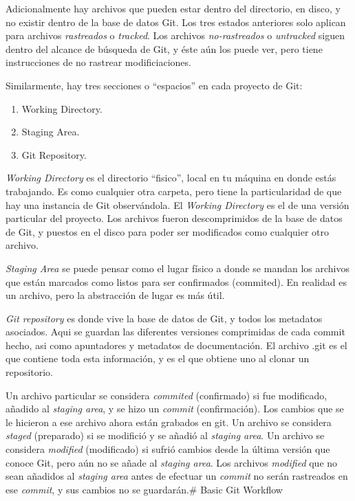 \documentclass[spanish, 12pt, a4paper]{article}
\begin{document}
Adicionalmente hay archivos que pueden estar dentro del directorio, en
disco, y no existir dentro de la base de datos Git. Los tres estados
anteriores solo aplican para archivos \emph{rastreados} o
\emph{tracked}. Los archivos \emph{no-rastreados} o \emph{untracked}
siguen dentro del alcance de búsqueda de Git, y éste aún los puede ver,
pero tiene instrucciones de no rastrear modificiaciones.

Similarmente, hay tres secciones o ``espacios'' en cada proyecto de Git:

\begin{enumerate}
\def\labelenumi{\arabic{enumi}.}
\item
  Working Directory.
\item
  Staging Area.
\item
  Git Repository.
\end{enumerate}

\emph{Working Directory} es el directorio ``fisico'', local en tu
máquina en donde estás trabajando. Es como cualquier otra carpeta, pero
tiene la particularidad de que hay una instancia de Git observándola. El
\emph{Working Directory} es el de una versión particular del proyecto.
Los archivos fueron descomprimidos de la base de datos de Git, y puestos
en el disco para poder ser modificados como cualquier otro archivo.

\emph{Staging Area} se puede pensar como el lugar físico a donde se
mandan los archivos que están marcados como listos para ser confirmados
(commited). En realidad es un archivo, pero la abstracción de lugar es
más útil.

\emph{Git repository} es donde vive la base de datos de Git, y todos los
metadatos asociados. Aqui se guardan las diferentes versiones
comprimidas de cada commit hecho, asi como apuntadores y metadatos de
documentación. El archivo .git es el que contiene toda esta información,
y es el que obtiene uno al clonar un repositorio.

Un archivo particular se considera \emph{commited} (confirmado) si fue
modificado, añadido al \emph{staging area}, y se hizo un \emph{commit}
(confirmación). Los cambios que se le hicieron a ese archivo ahora están
grabados en git. Un archivo se considera \emph{staged} (preparado) si se
modifició y se añadió al \emph{staging area}. Un archivo se considera
\emph{modified} (modificado) si sufrió cambios desde la última versión
que conoce Git, pero aún no se añade al \emph{staging area}. Los
archivos \emph{modified} que no sean añadidos al \emph{staging area}
antes de efectuar un \emph{commit} no serán rastreados en ese
\emph{commit}, y sus cambios no se guardarán.\# Basic Git Workflow
\end{document}

